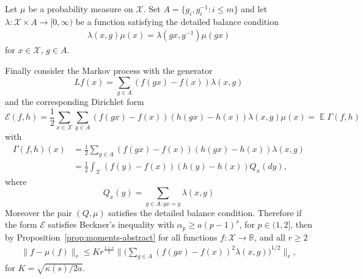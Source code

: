 \documentclass[a4paper]{amsart}
\theoremstyle{definition}
\theoremstyle{remark}
\numberwithin{equation}{section}
\newcommand*{\RR}{\mathbb{R}}
\newcommand{\calX}{\mathcal{X}}
\DeclareMathOperator{\EE}{\mathbb{E}} %
\newcommand*{\calE}{\mathcal{E}}
\begin{document}
Let $\mu$ be a probability measure on $\calX$. Set $A = \{g_i,g_i^{-1}\colon i \le m\}$ and let $ \lambda \colon \calX \times A\to [0,\infty)$ be a function satisfying the detailed balance condition
\begin{align}\label{eq:detailed-balance-group}
 \lambda(x,g)\mu(x) = \lambda(gx, g^{-1})\mu(gx)
\end{align}
for $x \in \calX$, $g \in A$.

Finally consider the Markov process with the generator
\begin{displaymath}
  L f (x) = \sum_{g \in A} (f(gx) - f(x))\lambda(x,g)
\end{displaymath}
and the corresponding Dirichlet form
\begin{displaymath}
  \calE(f,h)  = \frac{1}{2} \sum_{x\in \calX} \sum_{g \in A} (f(gx) - f(x))(h(gx) - h(x))\lambda(x,g) \mu(x) = \EE \Gamma(f,h)
\end{displaymath}
with
\begin{align*}
  \Gamma(f,h)(x) &= \frac{1}{2} \sum_{g \in A} (f(gx) - f(x))(h(gx) - h(x))\lambda(x,g) \\
  &= \frac{1}{2} \int_\calX (f(y) - f(x))(h(y) - h(x))Q_x(dy),
\end{align*}
where
\begin{displaymath}
Q_x(y) = \sum_{g \in A \colon gx = y}{\lambda}(x,g)
\end{displaymath}
Moreover the pair $(Q, \mu)$ satisfies the detailed balance condition.
Therefore if the form $\calE$ satisfies Beckner's inequality with $\alpha_p \ge a(p-1)^s$, for $p \in (1,2]$, then by Proposition~\ref{prop:moments-abstract} for all functions $f \colon \calX \to \RR$, and all $r \ge 2$
\begin{align}\label{eq:higher-order-moment-assumption}
  \|f - \mu (f)\|_r \le  Kr^{\frac{1+s}{2}} \Big\| \Big(\sum_{g \in A} (f(gx) - f(x))^2 \lambda(x,g)\Big)^{1/2}\Big\|_r,
\end{align}
for $K = \sqrt{\kappa(s)/2a}$.
\end{document}
